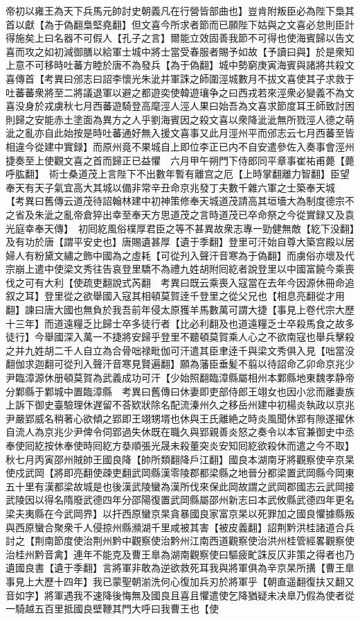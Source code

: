 帝初以雍王為天下兵馬元帥討史朝義凡在行營皆部曲也】豈肯附叛臣必為陛下梟其首以獻【為于偽翻梟堅堯翻】但文喜今所求者節而已願陛下姑與之文喜必怠則臣計得施矣上曰名器不可假人【孔子之言】爾能立效固善我節不可得也使海賓歸以告文喜而攻之如初減御膳以給軍士城中將士當受春服者賜予如故【予讀曰與】於是衆知上意不可移時吐蕃方睦於唐不為發兵【為于偽翻】城中勢窮庚寅海賓與諸將共殺文喜傳首【考異曰邠志曰詔李懷光朱泚并軍誅之師圍涇城數月不拔文喜使其子求救于吐蕃蕃衆將至二將議退軍以避之都遊奕使韓遊瓖争之曰西戎若來涇衆必變義不為文喜没身於戎虜秋七月西蕃遊騎登高麾涇人涇人果曰始吾為文喜求節度耳王師致討困則歸之安能赤土塗面為異方之人乎劉海賓因之殺文喜以衆降泚泚無所戮涇人德之萌泚之亂亦自此始按是時吐蕃通好無入援文喜事又此月涇州平而邠志云七月西蕃至皆相違今從建中實録】而原州竟不果城自上即位李正已内不自安遣參佐入奏事會涇州捷奏至上使觀文喜之首而歸正已益懼　六月甲午朔門下侍郎同平章事崔祐甫薨【薨呼肱翻】　術士桑道茂上言陛下不出數年暫有離宫之厄【上時掌翻離力智翻】臣望奉天有天子氣宜高大其城以備非常辛丑命京兆發丁夫數千雜六軍之士築奉天城　【考異曰舊傳云道茂待詔翰林建中初神策修奉天城道茂請高其垣墻大為制度德宗不之省及朱泚之亂帝倉猝出幸至奉天方思道茂之言時道茂已卒命祭之今從實録又及袁光庭幸奉天傳】　初囘紇風俗樸厚君臣之等不甚異故衆志專一勁健無敵【紇下没翻】及有功於唐【謂平安史也】唐賜遺甚厚【遺于季翻】登里可汗始自尊大築宫殿以居婦人有粉黛文繡之飾中國為之虛耗【可從刋入聲汗音寒為于偽翻】而虜俗亦壞及代宗崩上遣中使梁文秀往告哀登里驕不為禮九姓胡附囘紇者說登里以中國富饒今乘喪伐之可有大利【使疏吏翻說式芮翻　考異曰既云乘喪入寇當在去年今因源休冊命追叙之耳】登里從之欲舉國入寇其相頓莫賀逹千登里之從父兄也【相息亮翻從才用翻】諫曰唐大國也無負於我吾前年侵太原獲羊馬數萬可謂大捷【事見上卷代宗大歷十三年】而道遠糧乏比歸士卒多徒行者【比必利翻及也道遠糧乏士卒殺馬食之故多徒行】今舉國深入萬一不捷將安歸乎登里不聽頓莫賀乘人心之不欲南寇也舉兵擊殺之并九姓胡二千人自立為合骨咄禄毗伽可汗遣其臣聿逹千與梁文秀俱入見【咄當没翻伽求迦翻可從刋入聲汗音寒見賢遍翻】願為藩臣垂髪不翦以待詔命乙卯命京兆少尹臨漳源休册頓莫賀為武義成功可汗【少始照翻臨漳縣屬相州本鄴縣地東魏孝静帝分鄴縣于鄴城中置臨漳縣　考異曰舊傳曰休妻即吏部侍郎王翊女也因小忿而離妻族上訴下御史臺驗理休遅留不荅欵狀除名配流溱州久之移岳州建中初楊炎執政以京兆尹嚴郢威名稍著心欲傾之郢即王翊甥壻也休與王氏離絶之時炎風聞休郢有隙遂擢休自流人為京兆少尹俾令伺郢過失休既在職久與郢親善炎怒之奏令以本官兼御史中丞奉使囘紇按休奉使時囘紇方㳟順張光晟未殺董突炎安知囘紇欲殺休而遣之今不取】秋七月丙寅邵州賊帥王國良降【帥所類翻降戶江翻】國良本湖南牙將觀察使辛京杲使戍武岡【將即亮翻使疎吏翻武岡縣漢零陵郡都梁縣之地晉分都梁置武岡縣今岡東五十里有漢都梁故城是也後漢武陵蠻為漢所伐來保此岡故謂之武岡郡國志云武岡接武陵因以得名隋廢武德四年分邵陽復置武岡縣屬邵州新志曰本武攸縣武德四年更名梁夫夷縣在今武岡界】以扞西原蠻京杲貪暴國良家富京杲以死罪加之國良懼據縣叛與西原蠻合聚衆千人侵掠州縣瀕湖千里咸被其害【被皮義翻】詔荆黔洪桂諸道合兵討之【荆南節度使治荆州黔中觀察使治黔州江南西道觀察使治洪州桂管經畧觀察使治桂州黔音禽】連年不能克及曹王臯為湖南觀察使曰驅疲甿誅反仄非策之得者也乃遺國良書【遺于季翻】言將軍非敢為逆欲救死耳我與將軍俱為辛京杲所搆【曹王臯事見上大歷十四年】我已蒙聖朝湔洗何心復加兵刃於將軍乎【朝直遥翻復扶又翻又音如字】將軍遇我不速降後悔無及國良且喜且懼遣使乞降猶疑未决臯乃假為使者從一騎越五百里抵國良壁鞭其門大呼曰我曹王也【使